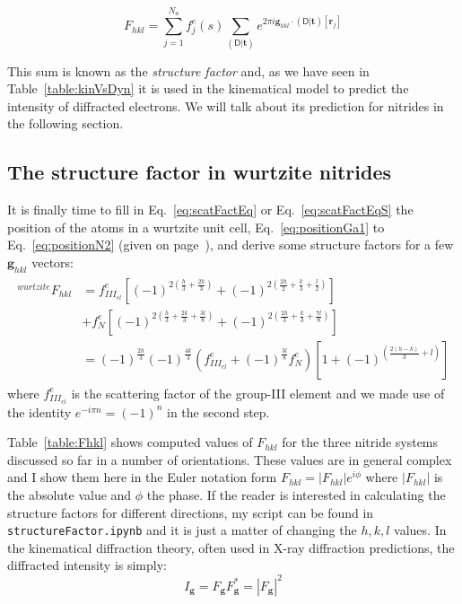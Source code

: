 \begin{equation}
\label{eq:scatFactEq}
F_{hkl} = \sum_{j=1}^{N_a} f^e_j(s) \sum_{(\mathsf{D}|\mathbf{t})} e^{2\pi i  \mathbf{g}_{hkl} \cdot (\mathsf{D}|\mathbf{t})[\mathbf{r}_j] }
\end{equation}



This sum is known as the \textit{structure factor} and, as we have seen in Table~\ref{table:kinVsDyn} it is used in the kinematical model to predict the intensity of diffracted electrons. We will talk about its prediction for nitrides in the following section.

%
\subsection{The structure factor in wurtzite nitrides}
{\label{sec:SF_GAN}}

It is finally time to fill in Eq.~\ref{eq:scatFactEq} or Eq.~\ref{eq:scatFactEqS} the position of the atoms in a wurtzite unit cell, Eq.~\ref{eq:positionGa1} to Eq.~\ref{eq:positionN2} (given on page~\pageref{eq:positionGa1}), and derive some structure factors for a few $\mathbf{g}_{hkl}$ vectors: 
\begin{align}
\begin{split}
\label{eq:scatFactWurzite}
^{wurtzite}F_{hkl} &= f^e_{III_{el}}  \left[(-1)^{2(\frac{h}{3} + \frac{2k}{3})}  + (-1)^{2(\frac{2h}{2} + \frac{k}{3} +\frac{l}{2})} \right] \\
                & + f^e_{N}  \left[(-1)^{2(\frac{h}{3} + \frac{2k}{3} + \frac{3l}{8})}  + (-1)^{2(\frac{2h}{3} + \frac{k}{3} +\frac{7l}{8})} \right] \\
                &= (-1)^\frac{2h}{3} (-1)^\frac{4k}{3}  \left( f^e_{III_{el}} +   (-1)^\frac{3l}{8} f^e_{N} \right) \left[ 1  + (-1)^{ (\frac{2(h-k)}{3}  + l)}  \right]
\end{split}
\end{align}
where $f^e_{III_{el}}$ is the scattering factor of the group-III element and we made use of the identity  $e^{-i \pi n}=(-1)^n$ in the second step.


Table~\ref{table:Fhkl} shows computed values of $F_{hkl}$ for the three nitride systems discussed so far in a number of orientations. These values are in general complex and I show them here in the Euler notation form $F_{hkl}=|F_{hkl}| e^{i\phi}$ where $|F_{hkl}|$ is the absolute value and $\phi$ the phase.  If the reader is interested in calculating the structure factors for different directions, my script can be found in \texttt{structureFactor.ipynb} and it is just a matter of changing the $h, k, l$ values. In the kinematical diffraction theory, often used in X-ray diffraction predictions, the diffracted intensity is simply:
\begin{equation}
\label{eq:KinInt}
 I_\mathbf{g} = F_\mathbf{g} F^*_\mathbf{g} =|F_\mathbf{g}|^2   
\end{equation}


